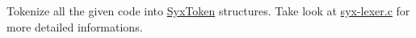 Tokenize all the given code into \hyperlink{struct_syx_token}{SyxToken} structures. Take look at \hyperlink{syx-lexer_8c}{syx-lexer.c} for more detailed informations. 